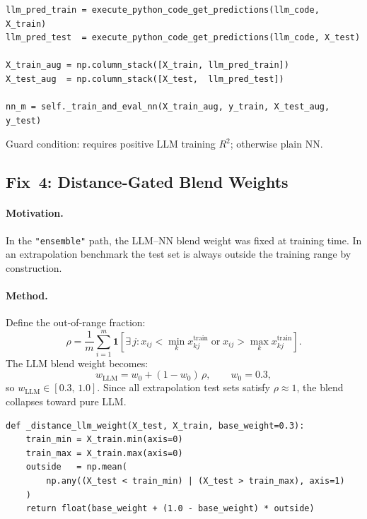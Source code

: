 \documentclass[twoside,11pt]{article}
\begin{document}
\begin{lstlisting}[caption={LLM-feature augmentation.}]
llm_pred_train = execute_python_code_get_predictions(llm_code, X_train)
llm_pred_test  = execute_python_code_get_predictions(llm_code, X_test)

X_train_aug = np.column_stack([X_train, llm_pred_train])
X_test_aug  = np.column_stack([X_test,  llm_pred_test])

nn_m = self._train_and_eval_nn(X_train_aug, y_train, X_test_aug, y_test)
\end{lstlisting}

Guard condition: requires positive LLM training $R^2$; otherwise plain NN.

\subsection{Fix~4: Distance-Gated Blend Weights}

\paragraph{Motivation.}
In the \texttt{"ensemble"} path, the LLM--NN blend weight was fixed at training
time.  In an extrapolation benchmark the test set is always outside the
training range by construction.

\paragraph{Method.}
Define the out-of-range fraction:
\[
  \rho = \frac{1}{m}\sum_{i=1}^{m}
         \mathbf{1}\!\left[
           \exists\,j : x_{ij} < \min_k x_{kj}^{\text{train}}
                       \;\text{or}\;
                       x_{ij} > \max_k x_{kj}^{\text{train}}
         \right].
\]
The LLM blend weight becomes:
\[
  w_{\text{LLM}} = w_0 + (1-w_0)\,\rho, \qquad w_0 = 0.3,
\]
so $w_{\text{LLM}} \in [0.3,\,1.0]$.  Since all extrapolation test sets satisfy
$\rho \approx 1$, the blend collapses toward pure LLM.

\begin{lstlisting}[caption={Distance-gated blend weight.}]
def _distance_llm_weight(X_test, X_train, base_weight=0.3):
    train_min = X_train.min(axis=0)
    train_max = X_train.max(axis=0)
    outside   = np.mean(
        np.any((X_test < train_min) | (X_test > train_max), axis=1)
    )
    return float(base_weight + (1.0 - base_weight) * outside)
\end{lstlisting}
\end{document}

